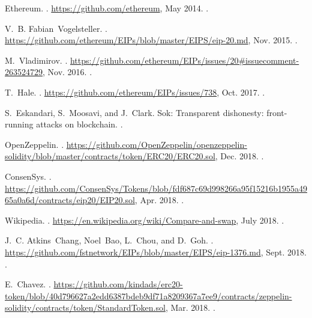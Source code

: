 \begin{thebibliography}{10}
\footnotesize

Ethereum.
.
\newblock \url{https://github.com/ethereum}, May 2014.
.

V.~B. Fabian~Vogelsteller.
.
\newblock \url{https://github.com/ethereum/EIPs/blob/master/EIPS/eip-20.md},
Nov. 2015.
.

M.~Vladimirov.
.
\newblock
\url{https://github.com/ethereum/EIPs/issues/20\#issuecomment-263524729},
Nov. 2016.
.

T.~Hale.
.
\newblock \url{https://github.com/ethereum/EIPs/issues/738}, Oct. 2017.
.

S.~Eskandari, S.~Moosavi, and J.~Clark.
\newblock Sok: Transparent dishonesty: front-running attacks on blockchain.
.

OpenZeppelin.
.
\newblock
\url{https://github.com/OpenZeppelin/openzeppelin-solidity/blob/master/contracts/token/ERC20/ERC20.sol},
Dec. 2018.
.

ConsenSys.
.
\newblock
\url{https://github.com/ConsenSys/Tokens/blob/fdf687c69d998266a95f15216b1955a4965a0a6d/contracts/eip20/EIP20.sol},
Apr. 2018.
.

Wikipedia.
.
\newblock \url{https://en.wikipedia.org/wiki/Compare-and-swap}, July 2018.
.

J.~C. Atkins~Chang, Noel~Bao, L.~Chou, and D.~Goh.
.
\newblock
  \url{https://github.com/fstnetwork/EIPs/blob/master/EIPS/eip-1376.md}, Sept.
  2018.
.

E.~Chavez.
.
\newblock
  \url{https://github.com/kindads/erc20-token/blob/40d796627a2edd6387bdeb9df71a8209367a7ee9/contracts/zeppelin-solidity/contracts/token/StandardToken.sol},
  Mar. 2018.
.



\end{thebibliography}
